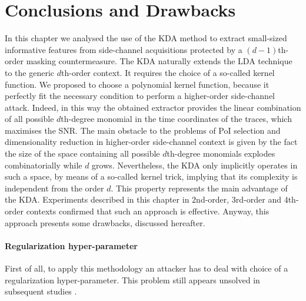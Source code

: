 \section{Conclusions and Drawbacks}
In this chapter we analysed the use of the KDA method to extract small-sized informative features from side-channel acquisitions protected by a $(d-1)$th-order masking countermeasure. The KDA naturally extends  the LDA technique to the generic $d$th-order context. It requires the choice of a so-called kernel function. We proposed to choose a polynomial kernel function, because it perfectly fit the necessary condition to perform a  higher-order side-channel attack. Indeed, in this way the obtained extractor  provides the linear combination of all possible $d$th-degree monomial in the time coordinates of the traces, which maximises the SNR.  The main obstacle to the problems of PoI selection and dimensionality reduction in higher-order side-channel context is given by the fact the size of the space containing all possible $d$th-degree monomials explodes combinatorially while $d$ grows. Nevertheless, the KDA only implicitly operates in such a space, by means of a so-called kernel trick, implying that its complexity is independent from the order $d$. This property represents the main advantage of the KDA. Experiments described in this chapter in $2$nd-order, $3$rd-order and $4$th-order contexts confirmed that such an approach is effective. Anyway, this approach presents some drawbacks, discussed hereafter. 

\paragraph*{Regularization hyper-parameter} First of all, to apply this methodology an attacker has to deal with choice of a regularization hyper-parameter. This problem still appears unsolved in subsequent studies \cite{zhou2017novel}. 
